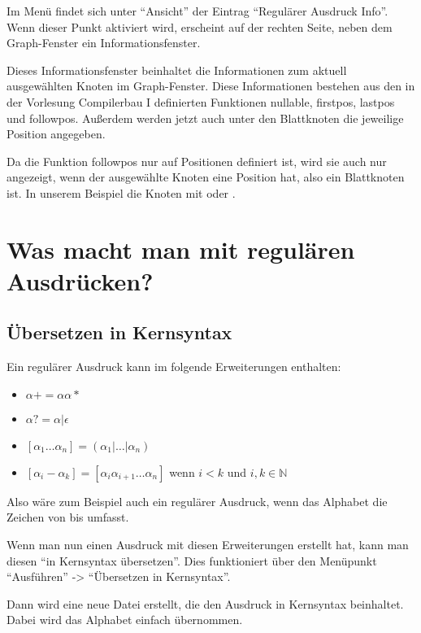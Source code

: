 Im Menü findet sich unter "`Ansicht"' der Eintrag "`Regulärer Ausdruck Info"'. Wenn dieser Punkt aktiviert wird, erscheint auf der rechten Seite, neben dem Graph-Fenster ein Informationsfenster.

Dieses Informationsfenster beinhaltet die Informationen zum aktuell ausgewählten Knoten im Graph-Fenster. Diese Informationen bestehen aus den in der Vorlesung Compilerbau I definierten Funktionen nullable, firstpos, lastpos und followpos. Außerdem werden jetzt auch unter den Blattknoten die jeweilige Position angegeben.

Da die Funktion followpos nur auf Positionen definiert ist, wird sie auch nur angezeigt, wenn der ausgewählte Knoten eine Position hat, also ein Blattknoten ist. In unserem Beispiel die Knoten mit  oder .

\section{Was macht man mit regulären Ausdrücken?}

\subsection{Übersetzen in Kernsyntax}

Ein regulärer Ausdruck kann im \gtitool folgende Erweiterungen enthalten:

\begin{itemize}
  \item $\alpha+ = \alpha \alpha*$
  \item $\alpha? = \alpha|\epsilon$
  \item $[\alpha _1\ldots\alpha _n] = (\alpha _1|\ldots|\alpha _n)$
  \item $[\alpha _i - \alpha _k] = [\alpha _i \alpha _{i+1}\ldots\alpha _n]$ wenn $i < k$ und $i,k\in{\mathbb N}$
\end{itemize}

Also wäre zum Beispiel auch \Symbol{[a-z]} ein regulärer Ausdruck, wenn das Alphabet die Zeichen von  bis  umfasst.

Wenn man nun einen Ausdruck mit diesen Erweiterungen erstellt hat, kann man diesen "`in Kernsyntax übersetzen"'. Dies funktioniert über den Menüpunkt "`Ausführen"' -> "`Übersetzen in Kernsyntax"'.

Dann wird eine neue Datei erstellt, die den Ausdruck in Kernsyntax beinhaltet. Dabei wird das Alphabet einfach übernommen.

